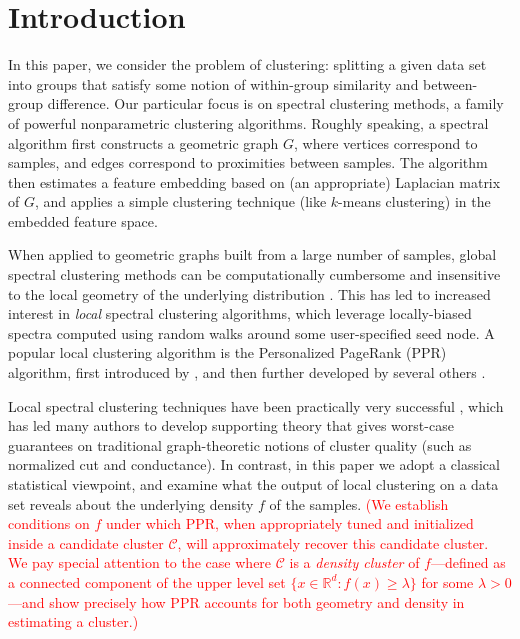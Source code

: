 \documentclass[11pt,twoside]{article}
\newcommand{\Reals}{\mathbb{R}}
\newcommand{\1}{\mathbf{1}}
\newcommand{\Rd}{\Reals^d}
\newcommand{\mc}[1]{\mathcal{#1}}
\begin{document}
\section{Introduction}
In this paper, we consider the problem of clustering: splitting a given data set
into groups that satisfy some notion of within-group similarity and
between-group difference.  Our particular focus is on spectral clustering
methods, a family of powerful nonparametric clustering algorithms. Roughly
speaking, a spectral algorithm first constructs a geometric graph $G$, where
vertices correspond to samples, and edges correspond to proximities between
samples. The algorithm then estimates a feature embedding based on (an
appropriate) Laplacian matrix of $G$, and applies a simple clustering technique
(like $k$-means clustering) in the embedded feature space.

When applied to geometric graphs built from a large number of samples, global
spectral clustering methods can be computationally cumbersome and insensitive to
the local geometry of the underlying distribution
\citep{leskovec2010,mahoney2012}.  This has led to increased interest in
\emph{local} spectral clustering algorithms, which leverage locally-biased
spectra computed using random walks around some user-specified seed node.  A
popular local clustering algorithm is the Personalized PageRank (PPR) algorithm,
first introduced by \citet{haveliwala2003}, and then further developed by
several others
\citep{spielman2011,spielman2014,andersen2006,mahoney2012,zhu2013}.  

Local spectral clustering techniques have been practically very successful
\citep{leskovec2010,andersen2012,gleich2012,mahoney2012,wu2012}, which has led
many authors to develop supporting theory
\citep{spielman2013,andersen2009,gharan2012,zhu2013} that gives worst-case
guarantees on traditional graph-theoretic notions of cluster quality (such as normalized cut and conductance). In contrast, in this paper we adopt a classical statistical viewpoint, and examine what the output of local clustering on a data set reveals about the underlying density $f$ of the samples. \textcolor{red}{(We establish conditions on $f$ under which PPR, when appropriately tuned and initialized inside a candidate cluster $\mc{C}$, will approximately recover this candidate cluster. We pay special attention to the case where $\mc{C}$ is a \emph{density cluster} of $f$---defined as a connected component of the upper level set $\{x \in \Rd : f(x) \geq \lambda\}$ for some $\lambda > 0$---and show precisely how PPR accounts for both geometry and density in estimating a cluster.)}\\
\end{document}
